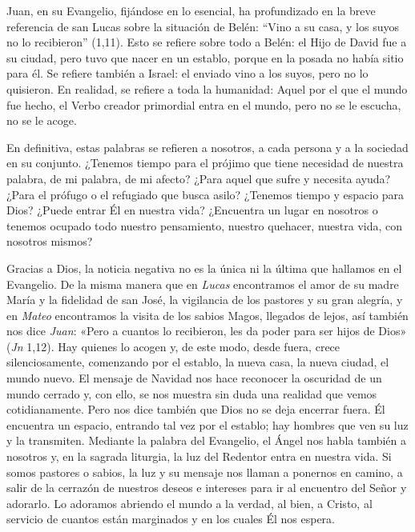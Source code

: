 Juan, en su Evangelio, fijándose en lo esencial, ha profundizado en la
breve referencia de san Lucas sobre la situación de Belén: ``Vino a su
casa, y los suyos no lo recibieron'' (1,11). Esto se refiere sobre todo
a Belén: el Hijo de David fue a su ciudad, pero tuvo que nacer en un
establo, porque en la posada no había sitio para él. Se refiere también
a Israel: el enviado vino a los suyos, pero no lo quisieron. En
realidad, se refiere a toda la humanidad: Aquel por el que el mundo fue
hecho, el Verbo creador primordial entra en el mundo, pero no se le
escucha, no se le acoge.

En definitiva, estas palabras se refieren a nosotros, a cada persona y a
la sociedad en su conjunto. ¿Tenemos tiempo para el prójimo que tiene
necesidad de nuestra palabra, de mi palabra, de mi afecto? ¿Para aquel
que sufre y necesita ayuda? ¿Para el prófugo o el refugiado que busca
asilo? ¿Tenemos tiempo y espacio para Dios? ¿Puede entrar Él en nuestra
vida? ¿Encuentra un lugar en nosotros o tenemos ocupado todo nuestro
pensamiento, nuestro quehacer, nuestra vida, con nosotros mismos?

Gracias a Dios, la noticia negativa no es la única ni la última que
hallamos en el Evangelio. De la misma manera que en \emph{Lucas}
encontramos el amor de su madre María y la fidelidad de san José, la
vigilancia de los pastores y su gran alegría, y en \emph{Mateo}
encontramos la visita de los sabios Magos, llegados de lejos, así
también nos dice \emph{Juan}: «Pero a cuantos lo recibieron, les da
poder para ser hijos de Dios» (\emph{Jn} 1,12). Hay quienes lo acogen y,
de este modo, desde fuera, crece silenciosamente, comenzando por el
establo, la nueva casa, la nueva ciudad, el mundo nuevo. El mensaje de
Navidad nos hace reconocer la oscuridad de un mundo cerrado y, con ello,
se nos muestra sin duda una realidad que vemos cotidianamente. Pero nos
dice también que Dios no se deja encerrar fuera. Él encuentra un
espacio, entrando tal vez por el establo; hay hombres que ven su luz y
la transmiten. Mediante la palabra del Evangelio, el Ángel nos habla
también a nosotros y, en la sagrada liturgia, la luz del Redentor entra
en nuestra vida. Si somos pastores o sabios, la luz y su mensaje nos
llaman a ponernos en camino, a salir de la cerrazón de nuestros deseos e
intereses para ir al encuentro del Señor y adorarlo. Lo adoramos
abriendo el mundo a la verdad, al bien, a Cristo, al servicio de cuantos
están marginados y en los cuales Él nos espera.

